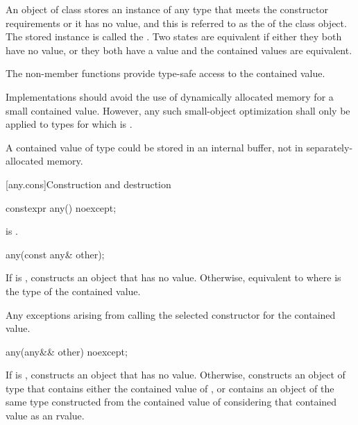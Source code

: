 \pnum
An object of class  stores an instance of any type that meets the constructor requirements or it has no value,
and this is referred to as the  of the class  object.
The stored instance is called the .
Two states are equivalent if either they both have no value, or they both have a value and the contained values are equivalent.

\pnum
The non-member  functions provide type-safe access to the contained value.

\pnum
Implementations should avoid the use of dynamically allocated memory for a small contained value.
However, any such small-object optimization shall only be applied to types  for which
 is .
\begin{example}
A contained value of type  could be stored in an internal buffer,
not in separately-allocated memory.
\end{example}

[any.cons]{Construction and destruction}

%
\begin{itemdecl}
constexpr any() noexcept;
\end{itemdecl}

\begin{itemdescr}
\pnum
\ensures
{} is .
\end{itemdescr}

%
\begin{itemdecl}
any(const any& other);
\end{itemdecl}

\begin{itemdescr}
\pnum
\effects
If  is , constructs an object that has no value.
Otherwise, equivalent to 
where  is the type of the contained value.

\pnum
\throws
Any exceptions arising from calling the selected constructor for the contained value.
\end{itemdescr}

%
\begin{itemdecl}
any(any&& other) noexcept;
\end{itemdecl}

\begin{itemdescr}
\pnum
\effects
If  is , constructs an object that has no value.
Otherwise, constructs an object of type  that
contains either the contained value of , or
contains an object of the same type constructed from
the contained value of  considering that contained value as an rvalue.
\end{itemdescr}

